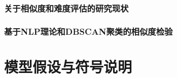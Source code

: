 \subsubsection{关于相似度和难度评估的研究现状}

\subsubsection{基于NLP理论和DBSCAN聚类的相似度检验}

\subsubsection{}

%
%

\section{模型假设与符号说明}
